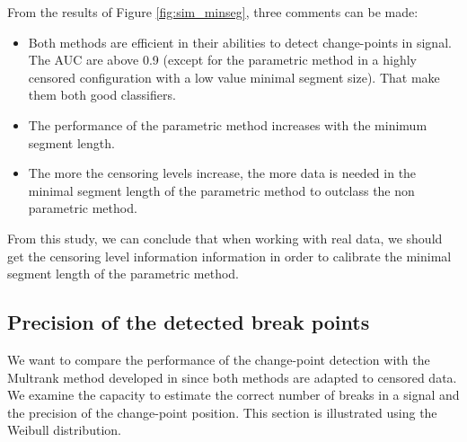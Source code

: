 From the results of Figure \ref{fig:sim_minseg}, three comments can be made:  
\begin{itemize}
\item Both methods are efficient in their abilities to detect change-points in signal. The AUC are above 0.9 (except for the parametric method in a highly censored configuration with a low value minimal segment size). That make them both good classifiers. 
\item The performance of the parametric method increases with the minimum segment length. 
\item The more the censoring levels increase, the more data is needed in the minimal segment length of the parametric method to outclass the non parametric method. 
\end{itemize}
From this study, we can conclude that when working with real data, we should get the censoring level information information in order to calibrate the minimal segment length of the parametric method.  

\subsection{Precision of the detected break points}

We want to compare the performance of the change-point detection with the Multrank method developed in \cite{lung2015} since both methods are adapted to censored data. We examine the capacity to estimate the correct number of breaks in a signal and the precision of the change-point position. This section is illustrated using the Weibull distribution.   

